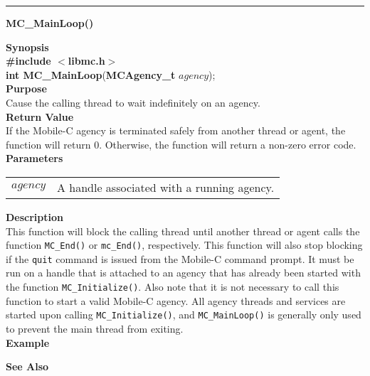 \noindent
\vspace{5pt}
\rule{6.5in}{0.015in}
\noindent
{\LARGE \bf MC\_MainLoop()}\\
{}

\noindent
{\bf Synopsis}\\
{\bf \#include $<$libmc.h$>$}\\
{\bf int MC\_MainLoop}({\bf MCAgency\_t} $agency$);\\

\noindent
{\bf Purpose}\\
Cause the calling thread to wait indefinitely on an agency.\\

\noindent
{\bf Return Value}\\
If the Mobile-C agency is terminated safely from another 
thread or agent, the function will return 0. Otherwise, the function will
return a non-zero error code. \\

\noindent
{\bf Parameters}
\vspace{-0.1in}
\begin{description}
\item               
\begin{tabular}{p{10 mm}p{145 mm}}
$agency$ & A handle associated with a running agency. 
\end{tabular}
\end{description}

\noindent
{\bf Description}\\
This function will block the calling thread until another thread or agent
calls the function \texttt{MC\_End()} or \texttt{mc\_End()}, respectively.
This function will also stop blocking if the \texttt{quit} command is issued
from the Mobile-C command prompt.
It must be run on a handle that is attached to an agency that has already 
been started with the function \texttt{MC\_Initialize()}. Also note that 
it is not necessary to call this function to start a valid Mobile-C
agency. All agency threads and services are started upon calling
\texttt{MC\_Initialize()}, and \texttt{MC\_MainLoop()} is generally
only used to prevent the main thread from exiting.\\

\noindent
{\bf Example}\\
\noindent
{\footnotesize}

\noindent
{\bf See Also}\\


